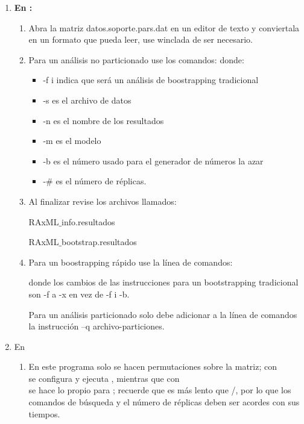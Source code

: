 \begin{enumerate}
\item \textbf{En :}
	\begin{enumerate}
	\item Abra la matriz datos.soporte.pars.dat en un editor de texto y conviertala en un formato que  pueda leer, use winclada de ser necesario.
	\item Para un an\'alisis no particionado use los comandos:
	donde:
		\begin{itemize}
			\item  -f i indica que ser\'a un an\'alisis de boostrapping tradicional
			\item  -s es el archivo de datos
			\item  -n es el nombre de los resultados
			\item  -m es el modelo
			\item  -b es el n\'umero usado para el generador de n\'umeros la azar
			\item  -$\#$ es el n\'umero de r\'eplicas.
		\end{itemize}

	\item Al finalizar revise los archivos llamados:

  	RAxML$\_$info.resultados 

  	RAxML$\_$bootstrap.resultados


	\item Para un boostrapping r\'apido use la l\'inea de comandos:


	donde los cambios de las instrucciones para un bootstrapping tradicional son -f a  -x en vez de -f i -b. 

	Para un an\'alisis particionado solo debe adicionar a la l\'inea de comandos la instrucci\'on –q archivo-particiones.

	\end{enumerate}

\item En 
	\begin{enumerate}
	\item  En este programa solo se hacen permutaciones sobre la matriz; con \\ se configura y ejecuta , mientras que con  \\ se hace lo propio para ;
	recuerde que  es m\'as lento que /, por lo que los comandos de b\'usqueda y el n\'umero de r\'eplicas deben ser acordes con sus tiempos.

	\end{enumerate}

\end{enumerate}




